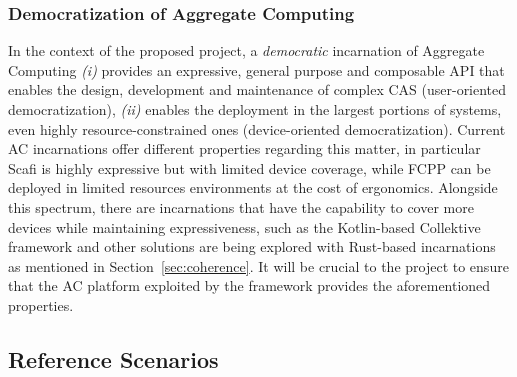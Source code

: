 \documentclass[12pt]{article}
\begin{document}
\subsubsection{Democratization of Aggregate Computing}
In the context of the proposed project, a \textit{democratic} incarnation of Aggregate Computing \textit{(i)} provides an expressive, general purpose and
composable API that enables the design, development and maintenance of complex CAS (user-oriented democratization), \textit{(ii)} enables the deployment
in the largest portions of systems, even highly resource-constrained ones (device-oriented democratization). Current AC incarnations offer different properties
regarding this matter, in particular Scafi is highly expressive but with limited device coverage, while FCPP can be deployed in limited resources environments
at the cost of ergonomics. Alongside this spectrum, there are incarnations that have the capability to cover more devices while maintaining expressiveness, such as the Kotlin-based
Collektive framework and other solutions are being explored with Rust-based incarnations as mentioned in Section~\ref{sec:coherence}. It will be crucial to the project
to ensure that the AC platform exploited by the framework provides the aforementioned properties.

\subsection{Reference Scenarios}
\label{sec:scenarios}

\end{document}
